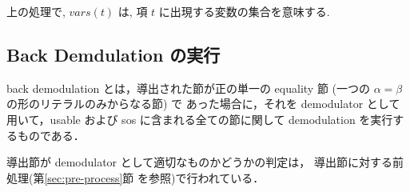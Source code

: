 上の処理で, $vars(t)$ は, 項 $t$ に出現する変数の集合を意味する.

\subsection{Back Demdulation の実行}
\label{sec:back-demodulate}

back demodulation とは，導出された節が正の単一の equality 節
(一つの $\alpha = \beta$ の形のリテラルのみからなる節) で
あった場合に，それを demodulator として用いて，usable および
sos に含まれる全ての節に関して demodulation を実行するものである．

導出節が demodulator として適切なものかどうかの判定は，
導出節に対する前処理(第\ref{sec:pre-process}節
を参照)で行われている．

